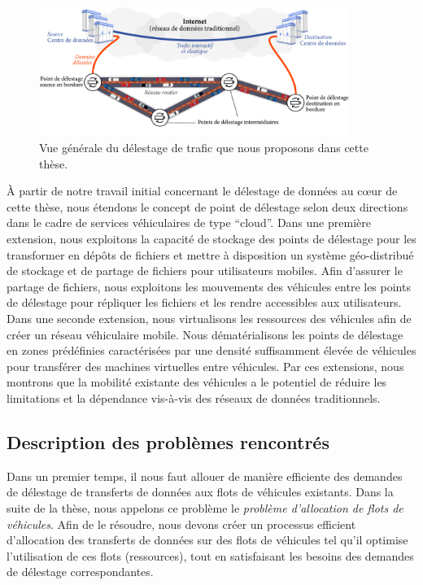  
\begin{figure}[t] 
\centering 
\includegraphics[width=0.9\textwidth]{figures-fr/architecture-2-fr.pdf} 
\caption{Vue générale du délestage de trafic que nous proposons dans cette thèse.} 
\label{fig:offloading-service-architecture-fr} 
\end{figure} 
 
 
À partir de notre travail initial concernant le délestage de données au cœur de cette thèse, nous étendons le concept de point de délestage selon deux directions dans le cadre de services véhiculaires de type ``cloud''. Dans une première extension, nous exploitons la capacité de stockage des points de délestage pour les transformer en dépôts de fichiers et mettre à disposition un système géo-distribué de stockage et de partage de fichiers pour utilisateurs mobiles. Afin d'assurer le partage de fichiers, nous exploitons les mouvements des véhicules entre les points de délestage pour répliquer les fichiers et les rendre accessibles aux utilisateurs. Dans une seconde extension, nous virtualisons les ressources des véhicules afin de créer un réseau véhiculaire mobile. Nous dématérialisons les points de délestage en zones prédéfinies caractérisées par une densité suffisamment élevée de véhicules pour transférer des machines virtuelles entre véhicules. Par ces extensions, nous montrons que la mobilité existante des véhicules a le potentiel de réduire les limitations et la dépendance vis-à-vis des réseaux de données traditionnels. 
 
 
\subsection{Description des problèmes rencontrés} 
 
 
Dans un premier temps, il nous faut allouer de manière efficiente des demandes de délestage de transferts de données aux flots de véhicules existants. Dans la suite de la thèse, nous appelons ce problème le \textit{problème d’allocation de flots de véhicules}. Afin de le résoudre, nous devons créer un processus efficient d’allocation des transferts de données sur des flots de véhicules tel qu’il optimise l'utilisation de ces flots (ressources), tout en satisfaisant les besoins des demandes de délestage correspondantes. 
 
